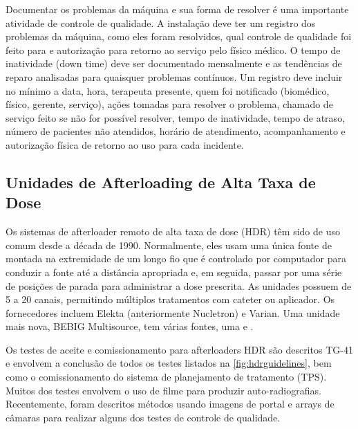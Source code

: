 \documentclass[11pt,a4paper]{article}
\begin{document}
	Documentar os problemas da máquina e sua forma de resolver é uma importante atividade de controle de qualidade. A instalação deve ter um registro dos problemas da máquina, como eles foram resolvidos, qual controle de qualidade foi feito para e autorização para retorno ao serviço pelo físico médico. O tempo de inatividade (down time) deve ser documentado mensalmente e as tendências de reparo analisadas para quaisquer problemas contínuos. Um registro deve incluir no mínimo a data, hora, terapeuta presente, quem foi notificado (biomédico, físico, gerente, serviço), ações tomadas para resolver o problema, chamado de serviço feito se não for possível resolver, tempo de inatividade, tempo de atraso, número de pacientes não atendidos, horário de atendimento, acompanhamento e autorização física de retorno ao uso para cada incidente.

\subsection*{Unidades de Afterloading de Alta Taxa de Dose}

	Os sistemas de afterloader remoto de alta taxa de dose (HDR) têm sido de uso comum desde a década de 1990. Normalmente, eles usam uma única fonte de  montada na extremidade de um longo fio que é controlado por computador para conduzir a fonte até a distância apropriada e, em seguida, passar por uma série de posições de parada para administrar a dose prescrita. As unidades possuem de 5 a 20 canais, permitindo múltiplos tratamentos com cateter ou aplicador. Os fornecedores incluem Elekta (anteriormente Nucletron) e Varian. Uma unidade mais nova, BEBIG Multisource, tem várias fontes, uma  e .

	Os testes de aceite e comissionamento para afterloaders HDR são descritos TG-41 e envolvem a conclusão de todos os testes listados na \ref{fig:hdrguidelines}, bem como o comissionamento do sistema de planejamento de tratamento (TPS). Muitos dos testes envolvem o uso de filme para produzir auto-radiografias. Recentemente, foram descritos métodos usando imagens de portal e arrays de câmaras para realizar alguns dos testes de controle de qualidade. 
\end{document}
